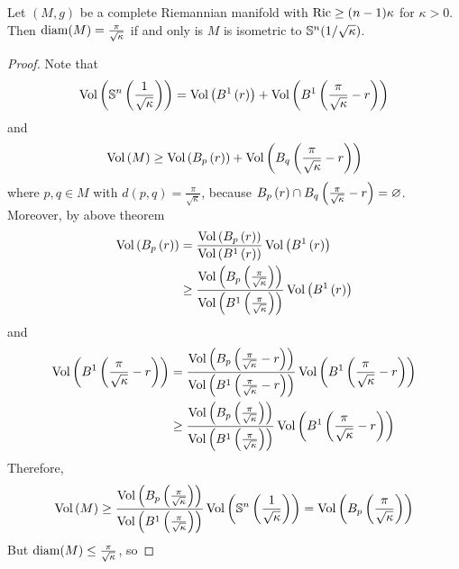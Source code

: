 \begin{enumerate}[label=\arabic{*}]
	\begin{thm}
		Let $(M,g)$ be a complete Riemannian manifold with $\operatorname{Ric} \geq (n-1)\kappa$ for $\kappa > 0$. Then $\operatorname{diam}(M) = \frac{\pi}{\sqrt{\kappa}}$ if and only is $M$ is isometric to $\mathbb{S}^n(1/\sqrt{\kappa})$.
	\end{thm}
	\begin{proof}
		Note that
		\begin{equation*}
			\operatorname{Vol}\left(\mathbb{S}^n\left(\frac{1}{\sqrt{\kappa}}\right)\right) = \operatorname{Vol}\left(B^1\left(r\right)\right)+ \operatorname{Vol}\left(B^1\left(\frac{\pi}{\sqrt{\kappa}}-r\right)\right)
		\end{equation*}
		and
		\begin{equation*}
			\operatorname{Vol}\left(M\right) \geq \operatorname{Vol}\left(B_p\left(r\right)\right)+ \operatorname{Vol}\left(B_q\left(\frac{\pi}{\sqrt{\kappa}}-r\right)\right)
		\end{equation*}
		where $p,q \in M$ with $d(p,q) = \frac{\pi}{\sqrt{\kappa}}$, because $B_p\left(r\right) \cap B_q\left(\frac{\pi}{\sqrt{\kappa}}-r\right) = \varnothing$. Moreover, by above theorem
		\begin{equation*}
			\begin{aligned}
				\operatorname{Vol}\left(B_p\left(r\right)\right) &= \frac{\operatorname{Vol}\left(B_p\left(r\right)\right)}{\operatorname{Vol}\left(B^1\left(r\right)\right)}\operatorname{Vol}\left(B^1\left(r\right)\right) \\
				&\geq \frac{\operatorname{Vol}\left(B_p\left(\frac{\pi}{\sqrt{\kappa}}\right)\right)}{\operatorname{Vol}\left(B^1\left(\frac{\pi}{\sqrt{\kappa}}\right)\right)}\operatorname{Vol}\left(B^1\left(r\right)\right) 
			\end{aligned}
		\end{equation*}
		and
		\begin{equation*}
			\begin{aligned}
				\operatorname{Vol}\left(B^1\left(\frac{\pi}{\sqrt{\kappa}}-r\right)\right) &= \frac{\operatorname{Vol}\left(B_p\left(\frac{\pi}{\sqrt{\kappa}}-r\right)\right)}{\operatorname{Vol}\left(B^1\left(\frac{\pi}{\sqrt{\kappa}}-r\right)\right)}\operatorname{Vol}\left(B^1\left(\frac{\pi}{\sqrt{\kappa}}-r\right)\right) \\
				&\geq \frac{\operatorname{Vol}\left(B_p\left(\frac{\pi}{\sqrt{\kappa}}\right)\right)}{\operatorname{Vol}\left(B^1\left(\frac{\pi}{\sqrt{\kappa}}\right)\right)}\operatorname{Vol}\left(B^1\left(\frac{\pi}{\sqrt{\kappa}}-r\right)\right)
			\end{aligned}
		\end{equation*}
		Therefore,
		\begin{equation*}
			\operatorname{Vol}\left(M\right) \geq \frac{\operatorname{Vol}\left(B_p\left(\frac{\pi}{\sqrt{\kappa}}\right)\right)}{\operatorname{Vol}\left(B^1\left(\frac{\pi}{\sqrt{\kappa}}\right)\right)}\operatorname{Vol}\left(\mathbb{S}^n\left(\frac{1}{\sqrt{\kappa}}\right)\right) = \operatorname{Vol}\left(B_p\left(\frac{\pi}{\sqrt{\kappa}}\right)\right)
		\end{equation*}
		But $\operatorname{diam}(M) \leq \frac{\pi}{\sqrt{\kappa}}$, so

\end{proof}
\end{enumerate}
